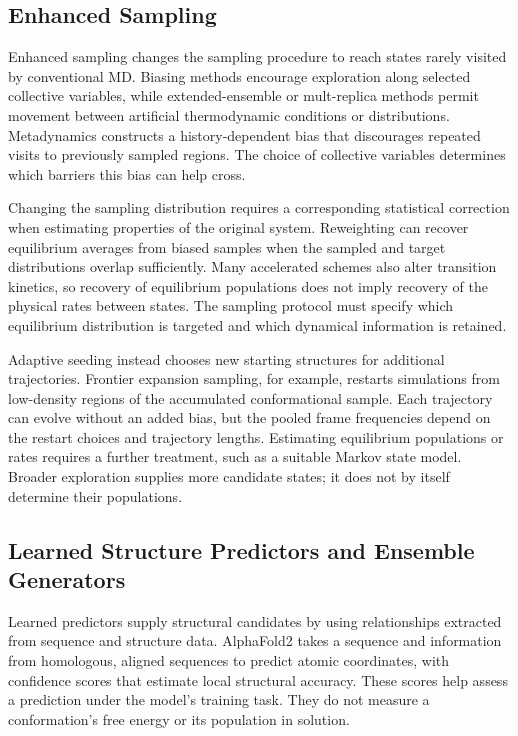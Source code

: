 \subsection{Enhanced Sampling}
\label{sec:bg-enhanced-sampling}

Enhanced sampling changes the sampling procedure to reach states rarely visited by conventional MD. Biasing methods encourage exploration along selected collective variables, while extended-ensemble or mult-replica methods permit movement between artificial thermodynamic conditions or distributions. Metadynamics constructs a history-dependent bias that discourages repeated visits to previously sampled regions. The choice of collective variables determines which barriers this bias can help cross.\supercite{heninEnhancedSamplingMethods2022,bussiUsingMetadynamicsExplore2020}

Changing the sampling distribution requires a corresponding statistical correction when estimating properties of the original system. Reweighting can recover equilibrium averages from biased samples when the sampled and target distributions overlap sufficiently. Many accelerated schemes also alter transition kinetics, so recovery of equilibrium populations does not imply recovery of the physical rates between states.\supercite{heninEnhancedSamplingMethods2022} The sampling protocol must specify which equilibrium distribution is targeted and which dynamical information is retained.

Adaptive seeding instead chooses new starting structures for additional trajectories. Frontier expansion sampling, for example, restarts simulations from low-density regions of the accumulated conformational sample.\supercite{zhangFrontierExpansionSampling2020} Each trajectory can evolve without an added bias, but the pooled frame frequencies depend on the restart choices and trajectory lengths. Estimating equilibrium populations or rates requires a further treatment, such as a suitable Markov state model.\supercite{heninEnhancedSamplingMethods2022} Broader exploration supplies more candidate states; it does not by itself determine their populations.

\subsection{Learned Structure Predictors and Ensemble Generators}
\label{sec:bg-learned-generators}

Learned predictors supply structural candidates by using relationships extracted from sequence and structure data. AlphaFold2 takes a sequence and information from homologous, aligned sequences to predict atomic coordinates, with confidence scores that estimate local structural accuracy.\supercite{jumperHighlyAccurateProtein2021} These scores help assess a prediction under the model's training task. They do not measure a conformation's free energy or its population in solution.\supercite{wayment-steelePredictingMultipleConformations2024}

